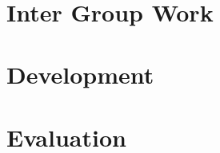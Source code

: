 



%

	\begin{titlepage}
	
	\thispagestyle{empty}

\ \pagebreak{} 
	\thispagestyle{empty}
	\end{titlepage}



\cleardoublepage
	
\newpage
\tableofcontents

\thispagestyle{empty}
\begin{titlepage}
\end{titlepage}
	
	
	\part{Inter Group Work}
	
	
 
\part{Development}
\label{part:development}

	
	
	
	
	
	
	
	
	
	
	
	
	
	
\part{Evaluation}
\label{part:evaluation}
	

	
  
	
	
	
		
		
		

	\cleardoublepage
{}
\label{chap:bib}

\listoffigures
\lstlistoflistings

\appendix	
	

